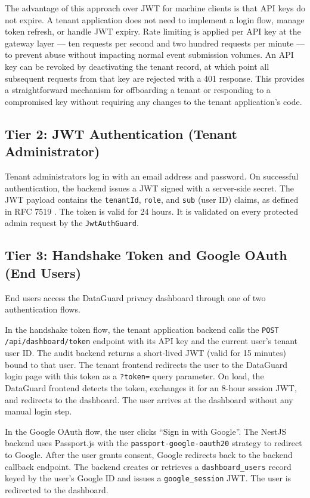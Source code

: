 \documentclass[a4paper,12pt,onecolumn]{report}
\begin{document}
The advantage of this approach over JWT for machine clients is that API keys do not expire.
A tenant application does not need to implement a login flow, manage token refresh, or handle JWT expiry.
Rate limiting is applied per API key at the gateway layer --- ten requests per second and two hundred requests per minute --- to prevent abuse without impacting normal event submission volumes.
An API key can be revoked by deactivating the tenant record, at which point all subsequent requests from that key are rejected with a 401 response.
This provides a straightforward mechanism for offboarding a tenant or responding to a compromised key without requiring any changes to the tenant application's code.

\subsection{Tier 2: JWT Authentication (Tenant Administrator)}

Tenant administrators log in with an email address and password.
On successful authentication, the backend issues a JWT signed with a server-side secret.
The JWT payload contains the \texttt{tenantId}, \texttt{role}, and \texttt{sub} (user ID) claims, as defined in RFC 7519 \cite{rfc7519}.
The token is valid for 24 hours.
It is validated on every protected admin request by the \texttt{JwtAuthGuard}.

\subsection{Tier 3: Handshake Token and Google OAuth (End Users)}

End users access the DataGuard privacy dashboard through one of two authentication flows.

In the handshake token flow, the tenant application backend calls the \texttt{POST /api/dashboard/token} endpoint with its API key and the current user's tenant user ID.
The audit backend returns a short-lived JWT (valid for 15 minutes) bound to that user.
The tenant frontend redirects the user to the DataGuard login page with this token as a \texttt{?token=} query parameter.
On load, the DataGuard frontend detects the token, exchanges it for an 8-hour session JWT, and redirects to the dashboard.
The user arrives at the dashboard without any manual login step.

In the Google OAuth flow, the user clicks ``Sign in with Google''.
The NestJS backend uses Passport.js with the \texttt{passport-google-oauth20} strategy to redirect to Google.
After the user grants consent, Google redirects back to the backend callback endpoint.
The backend creates or retrieves a \texttt{dashboard\_users} record keyed by the user's Google ID and issues a \texttt{google\_session} JWT.
The user is redirected to the dashboard.
\end{document}
